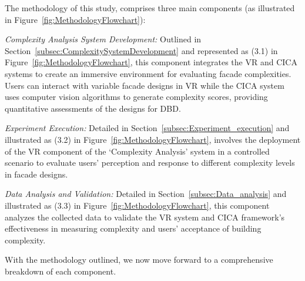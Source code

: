 The methodology of this study, comprises three main components (as illustrated in  Figure~\ref{fig:MethodologyFlowchart}):

\textit{Complexity Analysis System Development:}  Outlined in Section~\ref{subsec:ComplexitySystemDevelopment} and represented as (3.1) in Figure~\ref{fig:MethodologyFlowchart}, this component integrates the VR and CICA systems to create an immersive environment for evaluating facade complexities.
Users can interact with variable facade designs in VR while the CICA system uses computer vision algorithms to generate complexity scores, providing quantitative assessments of the designs for DBD\@.

\textit{Experiment Execution:} Detailed in Section~\ref{subsec:Experiment_execution} and illustrated as (3.2) in Figure~\ref{fig:MethodologyFlowchart}, involves the deployment of the VR component of the `Complexity Analysis' system in a controlled scenario to evaluate users' perception and response to different complexity levels in facade designs.

\textit{Data Analysis and Validation:} Detailed in Section~\ref{subsec:Data_analysis} and illustrated as (3.3) in Figure~\ref{fig:MethodologyFlowchart}, this component analyzes the collected data to validate the VR system and CICA framework's effectiveness in measuring complexity and
users' acceptance of building complexity.

With the methodology outlined, we now move forward to a comprehensive breakdown of each component.


